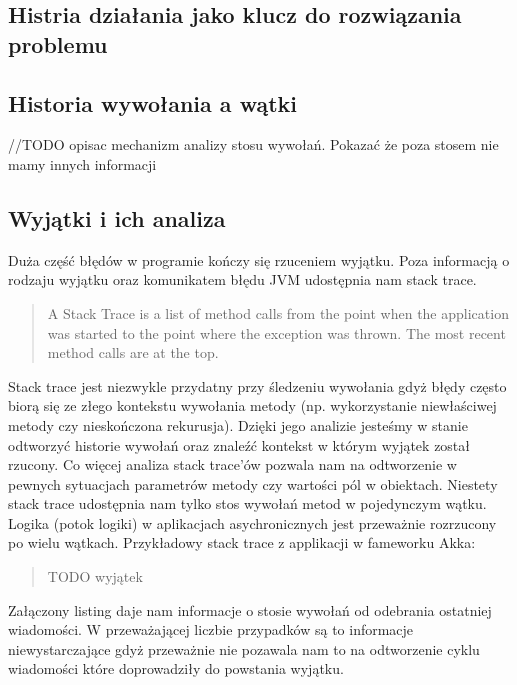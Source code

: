 \subsection{Histria działania jako klucz do rozwiązania problemu}

 

\subsection{Historia wywołania a wątki}

//TODO opisac mechanizm analizy stosu wywołań. Pokazać że poza stosem nie mamy innych informacji

\subsection{Wyjątki i ich analiza}
Duża część błędów w programie kończy się rzuceniem wyjątku. Poza informacją o rodzaju wyjątku oraz komunikatem błędu JVM udostępnia nam stack trace.

\begin{quote}
A Stack Trace is a list of method calls from the point when the application was started to the point where the exception was thrown. The most recent method calls are at the top.~\cite{javaProgramming}
\end{quote} 

Stack trace jest niezwykle przydatny przy śledzeniu wywołania gdyż błędy często biorą się ze złego kontekstu wywołania metody (np. wykorzystanie niewłaściwej metody czy nieskończona rekurusja). Dzięki jego analizie jesteśmy w stanie odtworzyć historie wywołań oraz znaleźć kontekst w którym wyjątek został rzucony. Co więcej analiza stack trace'ów pozwala nam na odtworzenie w pewnych sytuacjach parametrów metody czy wartości pól w obiektach.
Niestety stack trace udostępnia nam tylko stos wywołań metod w pojedynczym wątku. Logika (potok logiki) w aplikacjach asychronicznych jest przeważnie rozrzucony po wielu wątkach. Przykładowy stack trace z applikacji w fameworku Akka:

\begin{quote}
TODO wyjątek
\end{quote}

Załączony listing daje nam informacje o stosie wywołań od odebrania ostatniej wiadomości. W przeważającej liczbie przypadków są to informacje niewystarczające gdyż przeważnie nie pozawala nam to na odtworzenie cyklu wiadomości które doprowadziły do powstania wyjątku.

